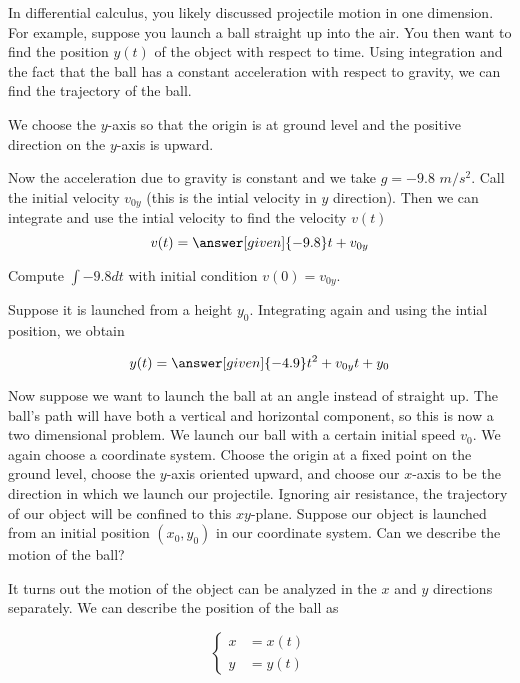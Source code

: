 \documentclass{ximera}
\begin{document}
\begin{example}

 In differential calculus, you likely discussed projectile motion in one dimension. For example, suppose you launch a ball straight up into the air. You then want to find the position
$y(t)$ of the object with respect to time. Using integration and the fact that the ball has a constant acceleration with respect to gravity, we can find the trajectory of the ball.

\begin{explanation}
We choose the $y$-axis so that the origin is at ground level and the positive direction on the $y$-axis is upward.

Now the acceleration due to gravity is constant and we take $g=-9.8$ $m/s^2$. Call the initial velocity $v_{0y}$ (this is the intial velocity in $y$ direction). Then we can integrate and use the intial velocity to find the velocity $v(t)$
\[
v(t)=\answer[given]{-9.8}t+v_{0y}
\]

\begin{hint}
Compute $\int -9.8 dt$ with initial condition $v(0)=v_{0y}$.
\end{hint}

Suppose it is launched from a height $y_{0}$. Integrating again and using the intial position, we obtain

\[
y(t)=\answer[given]{-4.9}t^2+v_{0y}t+ y_{0}
\]

\end{explanation}

Now suppose we want to launch the ball at an angle instead of straight up.  The ball's path will have both a vertical and horizontal component, so this is now a two dimensional problem. We launch our ball with a certain initial speed $v_{0}$. We again choose a coordinate system. Choose the origin at a fixed point on the ground level, choose the $y$-axis oriented upward, and choose our $x$-axis to be the direction in which we launch our projectile. Ignoring air resistance, the trajectory of our object will be confined to this $xy$-plane. Suppose our object is launched from an initial position $(x_{0},y_{0})$ in our coordinate system.  Can we describe the motion of the ball?

\begin{explanation}

It turns out the motion of the object can be analyzed in the $x$ and $y$ directions separately.  We can describe the position of the ball as

\[
\begin{cases}
x&=x(t) \\
y&=y(t)
\end{cases}
\]


\end{explanation}
\end{example}
\end{document}
